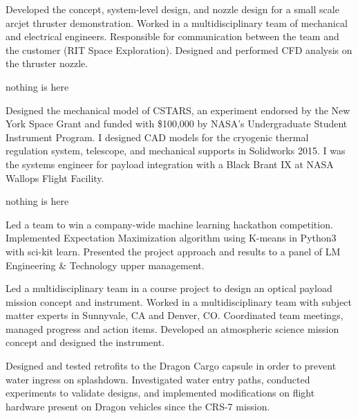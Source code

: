 \documentclass[10pt,final,sans]{resume}
\begin{document}
Developed the concept, system-level design, and nozzle design for a small scale arcjet thruster demonstration. Worked in a multidisciplinary team of mechanical and electrical engineers. Responsible for communication between the team and the customer (RIT Space Exploration). Designed and performed CFD analysis on the thruster nozzle.

nothing is here

Designed the mechanical model of CSTARS, an experiment endorsed by the New York Space Grant and funded with \$100,000 by NASA's Undergraduate Student Instrument Program. I designed CAD models for the cryogenic thermal regulation system, telescope, and mechanical supports in Solidworks 2015. I was the systems engineer for payload integration with a Black Brant IX at NASA Wallops Flight Facility.

nothing is here

Led a team to win a company-wide machine learning hackathon competition. Implemented Expectation Maximization algorithm using K-means in Python3 with sci-kit learn. Presented the project approach and results to a panel of LM Engineering \& Technology upper management. 

Led a multidisciplinary team in a course project to design an optical payload mission concept and instrument. Worked in a multidisciplinary team with subject matter experts in Sunnyvale, CA and Denver, CO. Coordinated team meetings, managed progress and action items. Developed an atmospheric science mission concept and designed the instrument.

Designed and tested retrofits to the Dragon Cargo capsule in order to prevent water ingress on splashdown. Investigated water entry paths, conducted experiments to validate designs, and implemented modifications on flight hardware present on Dragon vehicles since the CRS-7 mission.
\end{document}
